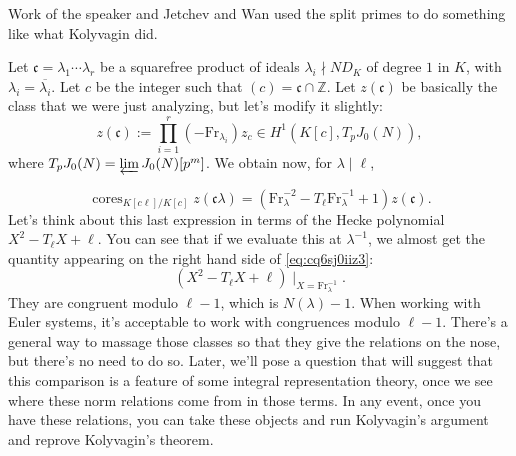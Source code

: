 \documentclass[reqno]{amsart} 
\begin{document}
Work of the speaker and Jetchev and Wan used the split primes to do something like what Kolyvagin did.

Let $\mathfrak{c} = \lambda_1 \dotsb \lambda_r$ be a squarefree product of ideals $\lambda_i \nmid N D_K$ of degree $1$ in $K$, with $\lambda_i =\overline{\lambda_i}$.  Let $c$ be the integer such that $(c) = \mathfrak{c} \cap \mathbb{Z}$.  Let $z(\mathfrak{c})$ be basically the class that we were just analyzing, but let's modify it slightly:
\begin{equation}\label{eq:cq6sj3hg5b}
  z(\mathfrak{c}) := \prod_{i = 1}^r \left( - \mathrm{Fr}_{\lambda_i} \right) z_c \in H^1(K[c], T_p J_0(N)),
\end{equation}
where $T_p J_0(N) = \varprojlim J_0(N)[p^m]$.  We obtain now, for $\lambda \mid \ell$,

\begin{equation}\label{eq:cq6sj0iiz3}
  \operatorname{cores}_{K[c \ell] / K[c]} z(\mathfrak{c} \lambda) = \left( \mathrm{Fr}_\lambda^{- 2} - T_{\ell} \mathrm{Fr}_\lambda^{-1} + 1 \right) z(\mathfrak{c}).
\end{equation}
Let's think about this last expression in terms of the Hecke polynomial $X^2 - T_{\ell} X + \ell$.  You can see that if we evaluate this at $\lambda^{-1}$, we almost get the quantity appearing on the right hand side of \eqref{eq:cq6sj0iiz3}:
\begin{equation*}
  (X^2 - T_{\ell} X + \ell) \mid_{X = \mathrm{Fr}_\lambda^{-1}}.
\end{equation*}
They are congruent modulo $\ell - 1$, which is $N(\lambda) - 1$.  When working with Euler systems, it's acceptable to work with congruences modulo $\ell - 1$.  There's a general way to massage those classes so that they give the relations on the nose, but there's no need to do so.  Later, we'll pose a question that will suggest that this comparison is a feature of some integral representation theory, once we see where these norm relations come from in those terms.  In any event, once you have these relations, you can take these objects and run Kolyvagin's argument and reprove Kolyvagin's theorem.
\end{document}
